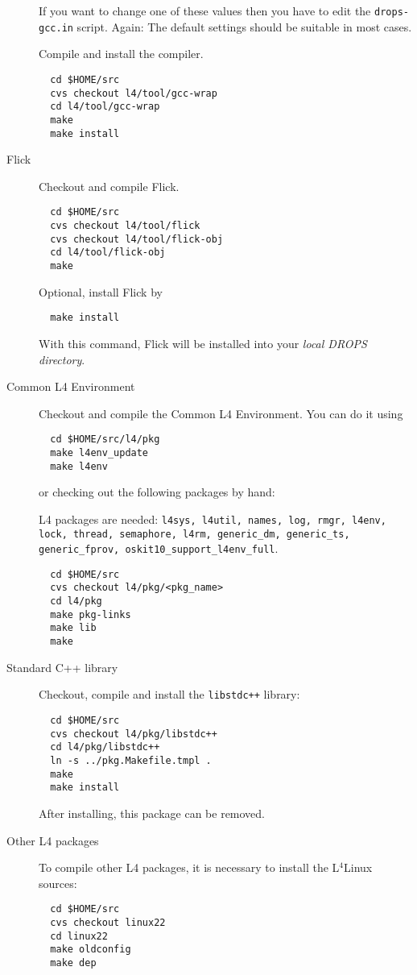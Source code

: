 \documentclass[twocolumn,10pt]{article}
\begin{document}
\begin{description}
If you want to change one of these values then you have to edit the 
\texttt{drops-gcc.in} script. Again: The default settings should be
suitable in most cases.

Compile and install the compiler.
\begin{verbatim}
  cd $HOME/src
  cvs checkout l4/tool/gcc-wrap
  cd l4/tool/gcc-wrap
  make
  make install
\end{verbatim}

\item[Flick]
Checkout and compile Flick.
\begin{verbatim}
  cd $HOME/src
  cvs checkout l4/tool/flick
  cvs checkout l4/tool/flick-obj
  cd l4/tool/flick-obj
  make
\end{verbatim}

Optional, install Flick by
\begin{verbatim}
  make install
\end{verbatim}
With this command, Flick will be installed into your 
\textsl{local DROPS directory}.

\item[Common L4 Environment]
Checkout and compile the Common L4 Environment. You can do it
using
\begin{verbatim}
  cd $HOME/src/l4/pkg
  make l4env_update
  make l4env
\end{verbatim}

or checking out the following packages by hand:

L4 packages are needed: \texttt{l4sys, l4util, names, log, rmgr,
l4env, lock, thread, semaphore, l4rm, generic\_dm, generic\_ts,
generic\_fprov, oskit10\_support\_l4env\_full}.
\begin{verbatim}
  cd $HOME/src
  cvs checkout l4/pkg/<pkg_name>
  cd l4/pkg
  make pkg-links
  make lib
  make
\end{verbatim}

\item[Standard C++ library]
Checkout, compile and install the \texttt{libstdc++} library:
\begin{verbatim}
  cd $HOME/src
  cvs checkout l4/pkg/libstdc++
  cd l4/pkg/libstdc++
  ln -s ../pkg.Makefile.tmpl .
  make
  make install
\end{verbatim}

After installing, this package can be removed.

\item[Other L4 packages]
To compile other L4 packages, it is necessary to install the
L$^{4}$Linux sources:
\begin{verbatim}
  cd $HOME/src
  cvs checkout linux22
  cd linux22
  make oldconfig
  make dep
\end{verbatim}

\end{description}
\end{document}
